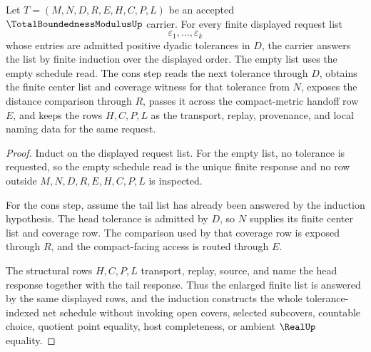 \begin{theorem}
\label{thm:total-boundedness-modulus-schedule-induction}
Let $T=(M,N,D,R,E,H,C,P,L)$ be an accepted $\TotalBoundednessModulusUp$ carrier. For every finite displayed request list
$$
\varepsilon_1,\ldots,\varepsilon_k
$$
whose entries are admitted positive dyadic tolerances in $D$, the carrier answers the list by finite induction over the displayed order. The empty list uses the empty schedule read. The cons step reads the next tolerance through $D$, obtains the finite center list and coverage witness for that tolerance from $N$, exposes the distance comparison through $R$, passes it across the compact-metric handoff row $E$, and keeps the rows $H,C,P,L$ as the transport, replay, provenance, and local naming data for the same request.
\end{theorem}
\begin{proof}
Induct on the displayed request list. For the empty list, no tolerance is requested, so the empty schedule read is the unique finite response and no row outside $M,N,D,R,E,H,C,P,L$ is inspected.

For the cons step, assume the tail list has already been answered by the induction hypothesis. The head tolerance is admitted by $D$, so $N$ supplies its finite center list and coverage row. The comparison used by that coverage row is exposed through $R$, and the compact-facing access is routed through $E$.

The structural rows $H,C,P,L$ transport, replay, source, and name the head response together with the tail response. Thus the enlarged finite list is answered by the same displayed rows, and the induction constructs the whole tolerance-indexed net schedule without invoking open covers, selected subcovers, countable choice, quotient point equality, host completeness, or ambient $\RealUp$ equality.
\end{proof}

